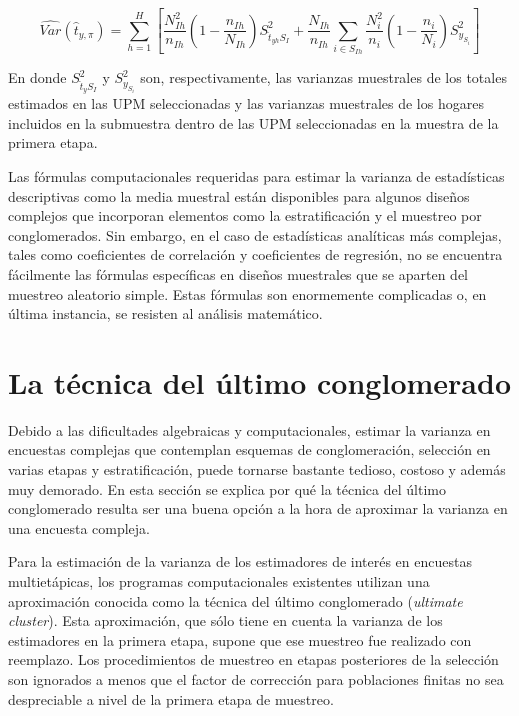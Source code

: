 \documentclass[
  12pt,
  spanish,
]{book}
\begin{document}
\[
\widehat{Var}(\hat{t}_{y,\pi})=
\sum_{h=1}^H\left[\frac{N_{Ih}^2}{n_{Ih}}\left(1-\frac{n_{Ih}}{N_{Ih}}\right)S^2_{\hat{t}_{yh}S_I}+
\frac{N_{Ih}}{n_{Ih}}\sum_{i\in S_{Ih}}\frac{N_i^2}{n_i}\left(1-\frac{n_i}{N_i}\right)S^2_{y_{S_i}}\right]
\]

En donde \(S^2_{\hat{t}_{y}S_I}\) y \(S^2_{y_{S_i}}\) son, respectivamente, las varianzas muestrales de los totales estimados en las UPM seleccionadas y las varianzas muestrales de los hogares incluidos en la submuestra dentro de las UPM seleccionadas en la muestra de la primera etapa.

Las fórmulas computacionales requeridas para estimar la varianza de estadísticas descriptivas como la media muestral están disponibles para algunos diseños complejos que incorporan elementos como la estratificación y el muestreo por conglomerados. Sin embargo, en el caso de estadísticas analíticas más complejas, tales como coeficientes de correlación y coeficientes de regresión, no se encuentra fácilmente las fórmulas específicas en diseños muestrales que se aparten del muestreo aleatorio simple. Estas fórmulas son enormemente complicadas o, en última instancia, se resisten al análisis matemático.

\hypertarget{la-tuxe9cnica-del-uxfaltimo-conglomerado}{%
\section{La técnica del último conglomerado}\label{la-tuxe9cnica-del-uxfaltimo-conglomerado}}

Debido a las dificultades algebraicas y computacionales, estimar la varianza en encuestas complejas que contemplan esquemas de conglomeración, selección en varias etapas y estratificación, puede tornarse bastante tedioso, costoso y además muy demorado. En esta sección se explica por qué la técnica del último conglomerado resulta ser una buena opción a la hora de aproximar la varianza en una encuesta compleja.

Para la estimación de la varianza de los estimadores de interés en encuestas multietápicas, los programas computacionales existentes utilizan una aproximación conocida como la técnica del último conglomerado (\emph{ultimate cluster}). Esta aproximación, que sólo tiene en cuenta la varianza de los estimadores en la primera etapa, supone que ese muestreo fue realizado con reemplazo. Los procedimientos de muestreo en etapas posteriores de la selección son ignorados a menos que el factor de corrección para poblaciones finitas no sea despreciable a nivel de la primera etapa de muestreo.
\end{document}
